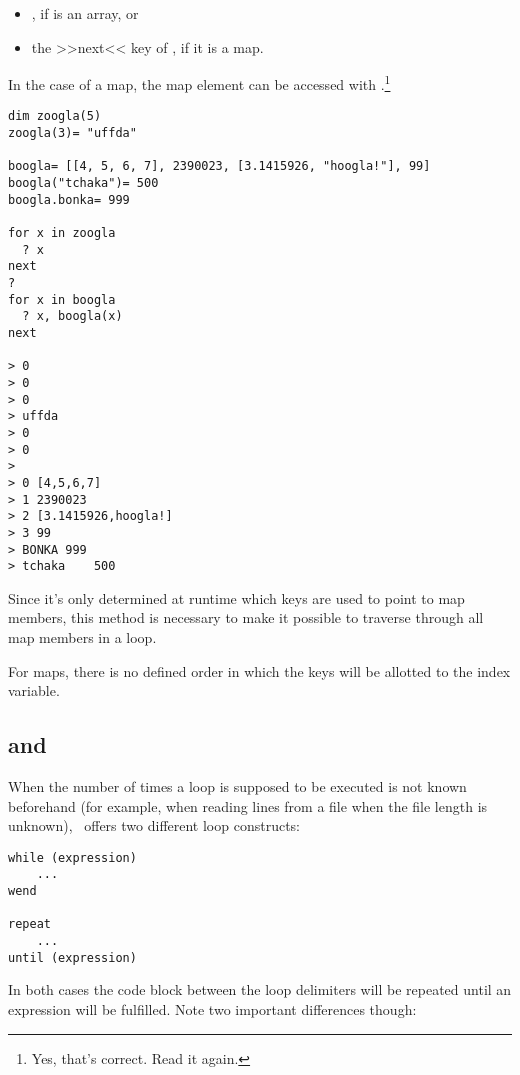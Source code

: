 \begin{itemize}

\item {}, if  is an array, or

\item the >>next<< key of , if it is a map.

\end{itemize}

In the case of a map, the map element can be accessed with
.\footnote{Yes, that's correct. Read it again.}

\begin{lstlisting}
dim zoogla(5)
zoogla(3)= "uffda"

boogla= [[4, 5, 6, 7], 2390023, [3.1415926, "hoogla!"], 99]
boogla("tchaka")= 500
boogla.bonka= 999

for x in zoogla
  ? x
next
?
for x in boogla
  ? x, boogla(x)
next 

> 0
> 0
> 0
> uffda
> 0
> 0
>
> 0	[4,5,6,7]
> 1	2390023
> 2	[3.1415926,hoogla!]
> 3	99
> BONKA	999
> tchaka	500
\end{lstlisting}

Since it's only determined at runtime which keys are used to point to
map members, this method is necessary to make it possible to traverse
through all map members in a loop.

For maps, there is no defined order in which the keys will be allotted
to the index variable.

\subsection{ and }

When the number of times a loop is supposed to be executed is not known
beforehand (for example, when reading lines from a file when the file
length is unknown), \SB\ offers two different loop constructs:

\begin{lstlisting}
while (expression)
	...
wend

repeat
	...
until (expression)
\end{lstlisting}

In both cases the code block between the loop delimiters will be
repeated until an expression will be fulfilled. Note two important
differences though:

